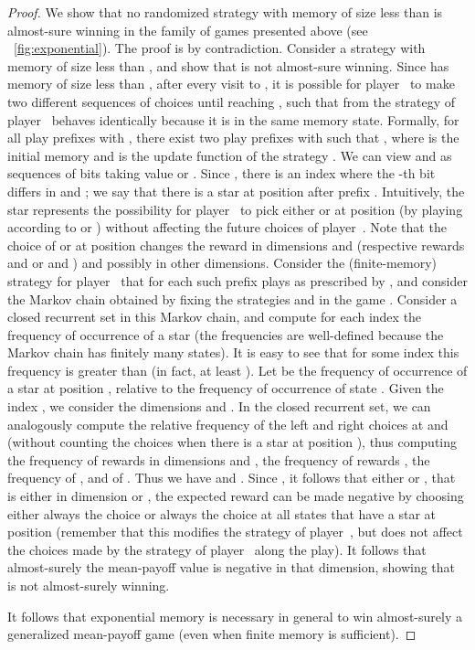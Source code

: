 \documentclass{article}
\begin{document}
\begin{proof}
We show that no randomized strategy with memory of size less than  
is almost-sure winning in the family of games  presented above (see \figurename~\ref{fig:exponential}). 
The proof is by contradiction. Consider a strategy 
with memory of size less than , and show that  is not 
almost-sure winning. Since  has memory of size less than ,
after every visit to , it is possible for player~ to make two
different sequences of choices until reaching , such that from 
the strategy  of player~ behaves identically because it is in the same memory state. 
Formally, for all play prefixes  with , 
there exist two play prefixes  with 
such that ,
where  is the initial memory and  is the update function
of the strategy .
We can view  and  as sequences of  bits taking value 
or . Since , there is an index  where
the -th bit differs in  and ; we say that there is a star at
position  after prefix . Intuitively, the star represents the possibility
for player~ to pick either  or  at position  (by playing according to
 or ) without affecting the future choices of player~.
Note that the choice of  or  at position  changes the reward in 
dimensions  and  (respective rewards  and  or  and ) and
possibly in other dimensions.
Consider the (finite-memory) strategy for player~ that for each such 
prefix  plays as prescribed by , 
and consider the Markov chain obtained by fixing the strategies 
and  in the game . Consider a closed recurrent set in this Markov chain,
and compute for each index  the frequency of occurrence of a star
(the frequencies are well-defined because the Markov chain has finitely many states).
It is easy to see that for some index  this frequency is greater than  (in fact,
at least ). Let  be the frequency of occurrence of a star at 
position ,
relative to the frequency of occurrence of state .
Given the index , we consider the dimensions  and . 
In the closed recurrent set, we can analogously compute the relative frequency of the left and right
choices at  and  (without counting the choices when there is a star at position ), 
thus computing the frequency  of rewards 
in dimensions  and , the frequency  of rewards , 
the frequency  of , and  of . 
Thus we have  and . Since ,
it follows that either  or , that is
either in dimension  or , the expected reward can be made negative 
by choosing either always the choice  or always the choice  at all states that have 
a star at position  (remember that this modifies the strategy  of player~, 
but does not affect the choices made by the strategy  of player~ along
the play). It follows that almost-surely the mean-payoff value 
is negative in that dimension, showing that  is not almost-surely winning.

It follows that exponential memory is necessary in general to win almost-surely 
a generalized mean-payoff game (even when finite memory is sufficient).
\end{proof}
\end{document}
